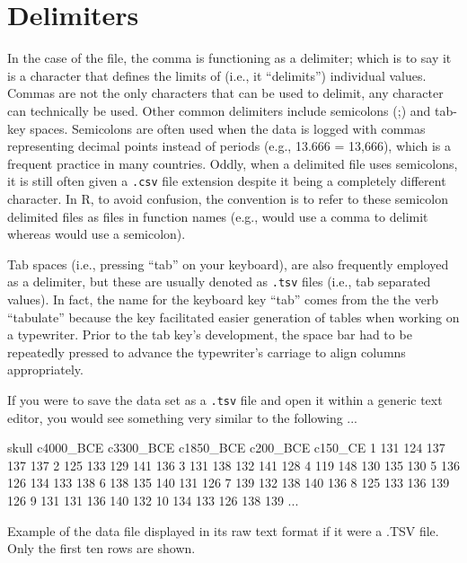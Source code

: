 \section{Delimiters}

In the case of the  file, the comma is functioning as a \gls{delimiter}; which is to say it is a character that defines the limits of (i.e., it ``delimits'') individual values. Commas are not the only characters that can be used to delimit, any character can technically be used. Other common delimiters include semicolons (;) and tab-key spaces. Semicolons are often used when the data is logged with commas representing decimal points instead of periods (e.g., 13.666 = 13,666), which is a frequent practice in many countries. Oddly, when a delimited file uses semicolons, it is still often given a \texttt{.csv} file extension despite it being a completely different character.  In R, to avoid confusion, the convention is to refer to these semicolon delimited files as  files in function names (e.g.,  would use a comma to delimit whereas  would use a semicolon).

Tab spaces (i.e., pressing ``tab'' on your keyboard), are also frequently employed as a delimiter, but these are usually denoted as \texttt{.tsv} files (i.e., tab separated values). In fact, the name for the keyboard key ``tab'' comes from the the verb ``tabulate'' because the key facilitated easier generation of tables when working on a typewriter. Prior to the tab key's development, the space bar had to be repeatedly pressed to advance the typewriter's carriage to align columns appropriately. 

If you were to save the  data set as a \texttt{.tsv} file and open it within a generic text editor, you would see something very similar to the following ...

\vspace{1em}
\begin{listing}[H]
\begin{raw}
skull	c4000_BCE	c3300_BCE	c1850_BCE	c200_BCE	c150_CE
1	131	124	137	137	137
2	125	133	129	141	136
3	131	138	132	141	128
4	119	148	130	135	130
5	136	126	134	133	138
6	138	135	140	131	126
7	139	132	138	140	136
8	125	133	136	139	126
9	131	131	136	140	132
10	134	133	126	138	139
...
\end{raw}
\caption*{Example of the  data file displayed in its raw text format if it were a .TSV file. Only the first ten rows are shown.}
\end{listing}
\vspace{1em}


